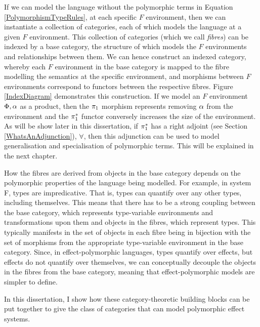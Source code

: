 \documentclass{Report}
\begin{document}
If we can model the language without the polymorphic terms in Equation \ref{PolymorphismTypeRules}, at each specific $F$ environment, then we can instantiate a collection of categories, each of which models the language at a given $F$ environment. This collection of categories (which we call \textit{fibres}) can be indexed by a base category, the structure of which models the $F$ environments and relationships between them. We can hence construct an indexed category, whereby each $F$ environment in the base category is mapped to the fibre modelling the semantics at the specific environment, and morphisms between $F$ environments correspond to functors between the respective fibres. Figure \ref{IndexDiagram} demonstrates this construction. If we model an $F$ environment $\Phi, \alpha$ as a product, then the $\pi_1$ morphism represents removing $\alpha$ from the environment and the $\pi_1^*$ functor conversely increases the size of the environment. As will be show later in this dissertation, if $\pi_1^*$ has a right adjoint (see Section \ref{WhatsAnAdjunction}), $\forall$, then this adjunction can be used to model generalisation and specialisation of polymorphic terms. This will be explained in the next chapter. 

How the fibres are derived from objects in the base category depends on the polymorphic properties of the language being modelled. For example, in system F, types are impredicative. That is, types can quantify over any other types, including themselves. This means that there has to be a strong coupling between the base category, which represents type-variable environments and transformations upon them and objects in the fibres, which represent types. This typically manifests in the set of objects  in each fibre being in bijection with the set of morphisms from the appropriate type-variable environment in the base category. Since, in effect-polymorphic languages, types quantify over effects, but effects do not quantify over themselves, we can conceptually decouple the objects in the fibres from the base category, meaning that effect-polymorphic models are simpler to define. 

In this dissertation, I show how these category-theoretic building blocks can be put together to give the class of categories that can model polymorphic effect systems.
\end{document}
